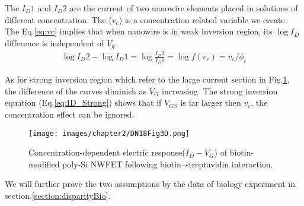 The $I_D1$ and $I_D2$ are the current of two nanowire elements placed in solutions of different concentration.
The ($v_c$) is a concentration related variable we create.
The Eq.\ref{eq:vc} implies that when nanowire is in weak inversion region, its $\log I_D$ difference is independent of $V_g$.
\begin{align}
    \log I_D2 - \log I_D1 = \log \frac{I_D2}{I_D1} = \log f(v_c) = v_c / \phi_t
\end{align}

As for strong inversion region which refer to the large current section in Fig.\ref{fig:DN17Fig6d}, the difference of the curves diminish as $V_G$ increasing.
The strong inversion equation (Eq.\ref{eq:ID_Strong}) shows that if $V_{GS}$ is far larger then $v_c$, the concentration effect can be ignored.

\begin{figure}[!htbp]
    \centering
    \texttt{[image: images/chapter2/DN18Fig3D.png]}
    \caption{Concentration-dependent electric response($I_D-V_G$) of biotin-modified poly-Si NWFET following biotin–streptavidin interaction.\cite{DN17}}
    \label{fig:DN17Fig6d}
\end{figure}

We will further prove the two assumptions by the data of biology experiment in section.\ref{section:disparityBio}.









%
